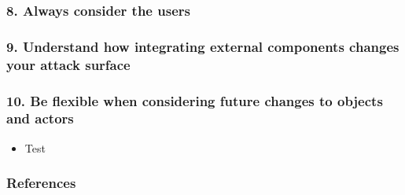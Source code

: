 \documentclass[12pt,norsk]{beamer}
\begin{document}
\begin{frame}

	\frametitle{8. Always consider the users}
	

\end{frame}

\begin{frame}

	\frametitle{9. Understand how integrating external components changes your attack surface}
	

\end{frame}

\begin{frame}

	\frametitle{10. Be flexible when considering future changes to objects and actors}
	\begin{itemize}
		\item Test \cite{sample}
	\end{itemize}
	
	

\end{frame}

\begin{frame}

	\frametitle{References}
		
	
		

\end{frame}




\end{document}
